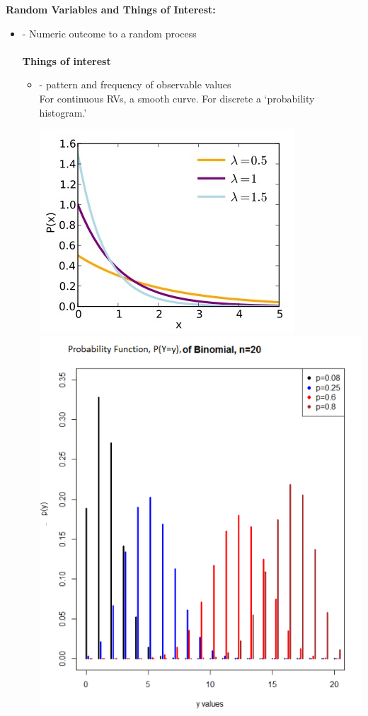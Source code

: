 \Large \noindent \textbf{Random Variables and Things of Interest:}\large\\
\begin{itemize}
\item 
\textcolor{red}{} 
- Numeric outcome to a random process\\~\\
\textbf{Things of interest}\\
\begin{itemize}
\item 
\textcolor{red}{} 
- pattern and frequency of observable values\\
For continuous RVs, a smooth curve.  For discrete a `probability histogram.'
\begin{center}
\includegraphics[scale=0.75]{Exponential_pdf}\includegraphics[scale=0.4]{binomialpmf}

\end{center}
\end{itemize}
\end{itemize}
